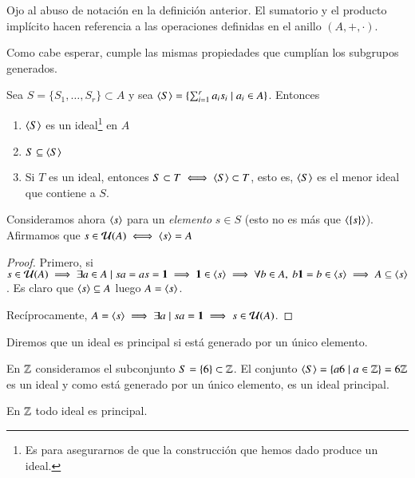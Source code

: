 Ojo al abuso de notación en la definición anterior. El sumatorio y el producto implícito hacen referencia a las operaciones definidas en el anillo $(A, +, \cdot)$.

Como cabe esperar, cumple las mismas propiedades que cumplían los subgrupos generados.

\begin{pro}
	Sea $S = \{S_1, \dots, S_r\} \subset A$ y sea $\langle S\rangle = \{\sum_{i=1}^{r}a_is_i \mid a_i \in A\}$. Entonces
	\begin{enumerate}
		\item $\langle S\rangle$ es un ideal\footnote{Es para asegurarnos de que la construcción que hemos dado produce un ideal.} en $A$
		\item $S \subseteq \langle S\rangle$
		\item Si $T$ es un ideal, entonces $S \subset T \iff \langle S\rangle \subset T$, esto es, $\langle S\rangle$ es el menor ideal que contiene a $S$.
	\end{enumerate}
\end{pro}

\begin{pro}
	Consideramos ahora $\langle s\rangle$ para un \textit{elemento} $s \in S$ (esto no es más que $\langle\{s\}\rangle$). Afirmamos que $s \in \mathcal{U}(A) \iff \langle s\rangle = A$
\end{pro}

\begin{proof}
	\label{pro:inunidadesiffgenerado}
	Primero, si $s \in \mathcal{U}(A) \implies \exists a \in A \mid sa = as = \mathbf{1} \implies \mathbf{1} \in \langle s\rangle \implies \forall b \in A,\ b\mathbf{1} = b \in \langle s\rangle \implies A \subseteq \langle s\rangle$. Es claro que $\langle s\rangle \subseteq A$ luego $A = \langle s\rangle$.
	
	Recíprocamente, $A = \langle s\rangle \implies \exists a \mid sa = \mathbf{1} \implies s \in \mathcal{U}(A)$.
\end{proof}

\begin{dfn}
	Diremos que un ideal es principal si está generado por un único elemento.
\end{dfn}

\begin{ej}
	En $\mathbb{Z}$ consideramos el subconjunto $S = \{6\} \subset \mathbb{Z}$. El conjunto $\langle S\rangle = \{a6 \mid a \in \mathbb{Z}\} = 6\mathbb{Z}$ es un ideal y como está generado por un único elemento, es un ideal principal.
\end{ej}

\begin{obs}
	En $\mathbb{Z}$ todo ideal es principal.
\end{obs}

